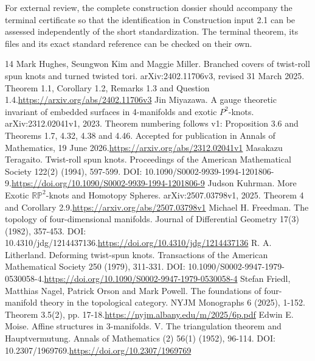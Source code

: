 \documentclass[11pt,letterpaper]{article}
\begin{document}
For external review, the complete construction dossier should accompany the terminal certificate so that the identification in Construction input 2.1 can be assessed independently of the short standardization. The terminal theorem, its files and its exact standard reference can be checked on their own.

\begin{thebibliography}{14}
 Mark Hughes, Seungwon Kim and Maggie Miller. Branched covers of twist-roll spun knots and turned twisted tori. arXiv:2402.11706v3, revised 31 March 2025. Theorem 1.1, Corollary 1.2, Remarks 1.3 and Question 1.4.\newline\url{https://arxiv.org/abs/2402.11706v3}
 Jin Miyazawa. A gauge theoretic invariant of embedded surfaces in 4-manifolds and exotic $P^2$-knots. arXiv:2312.02041v1, 2023. Theorem numbering follows v1: Proposition 3.6 and Theorems 1.7, 4.32, 4.38 and 4.46. Accepted for publication in Annals of Mathematics, 19 June 2026.\newline\url{https://arxiv.org/abs/2312.02041v1}
 Masakazu Teragaito. Twist-roll spun knots. Proceedings of the American Mathematical Society 122(2) (1994), 597-599. DOI: 10.1090/S0002-9939-1994-1201806-9.\newline\url{https://doi.org/10.1090/S0002-9939-1994-1201806-9}
 Judson Kuhrman. More Exotic $\mathbb{RP}^2$-knots and Homotopy Spheres. arXiv:2507.03798v1, 2025. Theorem 4 and Corollary 2.9.\newline\url{https://arxiv.org/abs/2507.03798v1}
 Michael H. Freedman. The topology of four-dimensional manifolds. Journal of Differential Geometry 17(3) (1982), 357-453. DOI: 10.4310/jdg/1214437136.\newline\url{https://doi.org/10.4310/jdg/1214437136}
 R. A. Litherland. Deforming twist-spun knots. Transactions of the American Mathematical Society 250 (1979), 311-331. DOI: 10.1090/S0002-9947-1979-0530058-4.\newline\url{https://doi.org/10.1090/S0002-9947-1979-0530058-4}
 Stefan Friedl, Matthias Nagel, Patrick Orson and Mark Powell. The foundations of four-manifold theory in the topological category. NYJM Monographs 6 (2025), 1-152. Theorem 3.5(2), pp. 17-18.\newline\url{https://nyjm.albany.edu/m/2025/6p.pdf}
 Edwin E. Moise. Affine structures in 3-manifolds. V. The triangulation theorem and Hauptvermutung. Annals of Mathematics (2) 56(1) (1952), 96-114. DOI: 10.2307/1969769.\newline\url{https://doi.org/10.2307/1969769}

\end{thebibliography}
\end{document}
